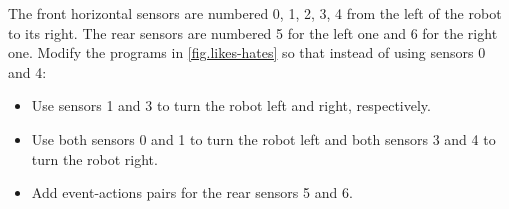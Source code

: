
 { The front horizontal sensors are numbered
0, 1, 2, 3, 4 from the left of the robot to its right. The rear sensors
are numbered 5 for the left one and 6 for the right one. Modify the
programs in \cref{fig.likes-hates} so that instead of
using sensors 0 and 4:
\begin{itemize}[noitemsep,nosep,leftmargin=*]
\item Use sensors 1 and 3 to turn the robot left and right, respectively.
\item Use both sensors 0 and 1 to turn the robot left and both sensors 3
and 4 to turn the robot right.
\item Add event-actions pairs for the rear sensors 5 and 6.
\end{itemize}
}

\bigskip


\bigskip

